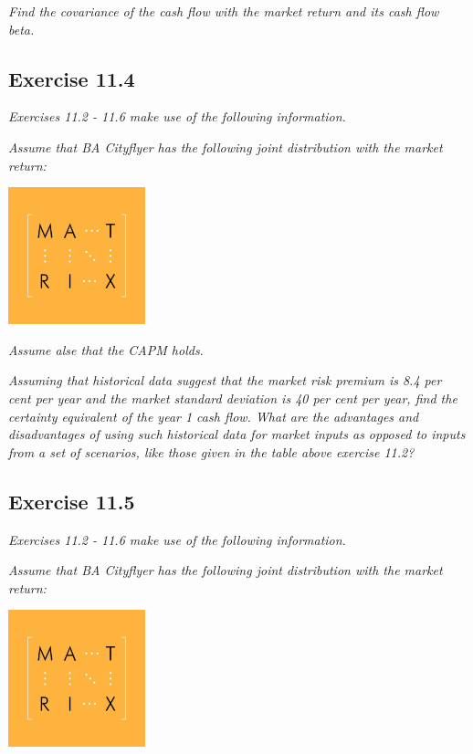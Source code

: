 \documentclass[]{book}
\theoremstyle{definition}
\theoremstyle{definition}
\theoremstyle{remark}
\begin{document}
\emph{Find the covariance of the cash flow with the market return and
its cash flow beta.} \citep[p.389]{book}

\subsection{Exercise 11.4}\label{exercise-11.4}

\emph{Exercises 11.2 - 11.6 make use of the following information.}
\citep[p.389]{book}

\emph{Assume that BA Cityflyer has the following joint distribution with
the market return:} \citep[p.389]{book}

\begin{center}\includegraphics[width=150px]{figures/matrix} \end{center}

\emph{Assume alse that the CAPM holds.} \citep[p.389]{book}

\emph{Assuming that historical data suggest that the market risk premium
is 8.4 per cent per year and the market standard deviation is 40 per
cent per year, find the certainty equivalent of the year 1 cash flow.
What are the advantages and disadvantages of using such historical data
for market inputs as opposed to inputs from a set of scenarios, like
those given in the table above exercise 11.2?} \citep[p.389]{book}

\subsection{Exercise 11.5}\label{exercise-11.5}

\emph{Exercises 11.2 - 11.6 make use of the following information.}
\citep[p.389]{book}

\emph{Assume that BA Cityflyer has the following joint distribution with
the market return:} \citep[p.389]{book}

\begin{center}\includegraphics[width=150px]{figures/matrix} \end{center}
\end{document}
